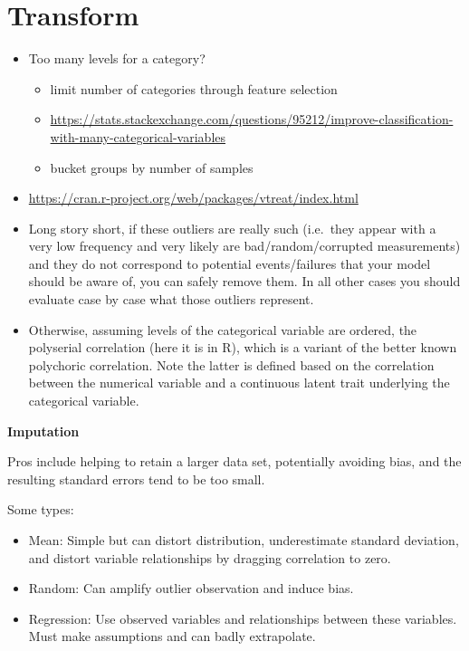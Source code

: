 \documentclass[]{book}
\providecommand{\tightlist}{%
  \setlength{\itemsep}{0pt}\setlength{\parskip}{0pt}}
\theoremstyle{definition}
\theoremstyle{definition}
\theoremstyle{definition}
\theoremstyle{remark}
\begin{document}
\section{Transform}\label{transform}

\begin{itemize}
\item
  Too many levels for a category?

  \begin{itemize}
  \tightlist
  \item
    limit number of categories through feature selection
  \item
    \url{https://stats.stackexchange.com/questions/95212/improve-classification-with-many-categorical-variables}
  \item
    bucket groups by number of samples
  \end{itemize}
\item
  \url{https://cran.r-project.org/web/packages/vtreat/index.html}
\item
  Long story short, if these outliers are really such (i.e.~they appear
  with a very low frequency and very likely are bad/random/corrupted
  measurements) and they do not correspond to potential events/failures
  that your model should be aware of, you can safely remove them. In all
  other cases you should evaluate case by case what those outliers
  represent.
\item
  Otherwise, assuming levels of the categorical variable are ordered,
  the polyserial correlation (here it is in R), which is a variant of
  the better known polychoric correlation. Note the latter is defined
  based on the correlation between the numerical variable and a
  continuous latent trait underlying the categorical variable.
\end{itemize}

\textbf{Imputation}

Pros include helping to retain a larger data set, potentially avoiding
bias, and the resulting standard errors tend to be too small.

Some types:

\begin{itemize}
\item
  Mean: Simple but can distort distribution, underestimate standard
  deviation, and distort variable relationships by dragging correlation
  to zero.
\item
  Random: Can amplify outlier observation and induce bias.
\item
  Regression: Use observed variables and relationships between these
  variables. Must make assumptions and can badly extrapolate.
\end{itemize}
\end{document}
